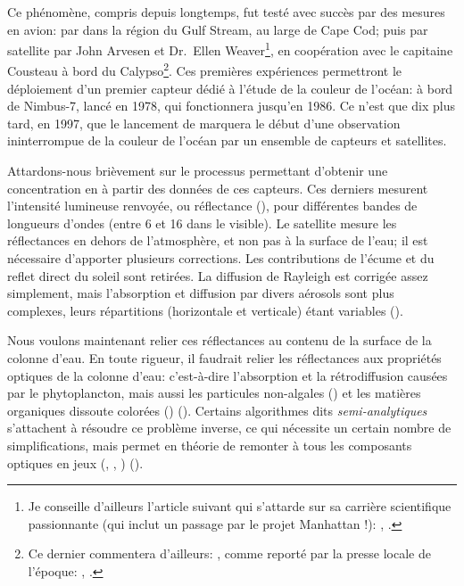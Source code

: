 Ce phénomène, compris depuis longtemps, fut testé avec succès par des mesures en avion:  par \textcite{clarke_1970} dans la région du Gulf Stream, au large de Cape Cod; puis par satellite par John Arvesen et Dr.\ Ellen Weaver\footnote{%
  Je conseille d'ailleurs l'article suivant qui s'attarde sur sa carrière scientifique passionnante (qui inclut un passage par le projet Manhattan !): , \cite{marshall_2010}.},
en coopération avec le capitaine Cousteau à bord du Calypso\footnote{%
  Ce dernier commentera d'ailleurs: , comme reporté par la presse locale de l'époque:
  , \cite{macomber_1973}.
}.
Ces premières expériences permettront le déploiement d'un premier capteur dédié à l'étude de la couleur de l'océan:  à bord de Nimbus-7, lancé en 1978, qui fonctionnera jusqu'en 1986.
Ce n'est que dix plus tard, en 1997, que le lancement de  marquera le début d'une observation ininterrompue de la couleur de l'océan par un ensemble de capteurs et satellites.

Attardons-nous brièvement sur le processus permettant d'obtenir une concentration en  à partir des données de ces capteurs.
Ces derniers mesurent l'intensité lumineuse renvoyée, ou réflectance (), pour différentes bandes de longueurs d'ondes (entre 6 et 16 dans le visible).
Le satellite mesure les réflectances en dehors de l'atmosphère, et non pas à la surface de l'eau; il est nécessaire d'apporter plusieurs corrections.
Les contributions de l'écume et du reflet direct du soleil sont retirées.
La diffusion de Rayleigh est corrigée assez simplement, mais l'absorption et diffusion par divers aérosols sont plus complexes, leurs répartitions (horizontale et verticale) étant variables (\cite{werdell_2018}).

Nous voulons maintenant relier ces réflectances au contenu de la surface de la colonne d'eau.
En toute rigueur, il faudrait relier les réflectances aux propriétés optiques de la colonne d'eau: c'est-à-dire l’absorption et la rétrodiffusion causées par le phytoplancton, mais aussi les particules non-algales () et les matières organiques dissoute colorées () (\cite{werdell_2018}).
Certains algorithmes dits \emph{semi-analytiques} s'attachent à résoudre ce problème inverse, ce qui nécessite un certain nombre de simplifications, mais permet en théorie de remonter à tous les composants optiques en jeux (, , ) (\cite{werdell_2019}).

